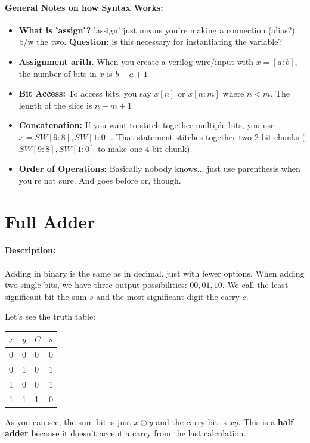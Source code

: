 \documentclass[a4paper,12pt]{report}
\begin{document}
\paragraph{General Notes on how Syntax Works:}
\begin{itemize}
\item \textbf{What is 'assign'? } 'assign' just means you're making a connection (alias?) b/w the
two. \textbf{Question: } is this necessary for instantiating the variable?
\item \textbf{Assignment arith.} When you create a verilog wire/input with $x = [a:b]$, the number of bits in 
$x$ is $b-a + 1$
\item \textbf{Bit Access: } To access bits, you say $x[n]$ or $x[n:m]$ where $n < m$. The length of the slice
is $n-m +1$
\item \textbf{Concatenation: } If you want to stitch together multiple bits, you use $x = {SW[9:8], SW[1:0]}$. That
statement stitches together two 2-bit chunks ($SW[9:8], SW[1:0]$ to make one 4-bit chunk).
\item \textbf{Order of Operations: } Basically nobody knows... just use parenthesis when you're
not sure. And goes before or, though.
\end{itemize}


\section{Full Adder}
\paragraph{Description: }
Adding in binary is the same as in decimal, just with fewer options. When adding two single bits,
we have three output possibilities: $00, 01, 10$. We call the least significant bit the sum $s$ and
the most significant digit the carry $c$.

Let's see the truth table:
\begin{tabular}{ll|ll}
$x$ & $y$ & $C$ & $s$ \\
\hline
0 & 0 & 0 & 0 \\
0 & 1 & 0 & 1 \\
1 & 0 & 0 & 1 \\
1 & 1 & 1 & 0 \\
\end{tabular}

As you can see, the sum bit is just $x \oplus y$ and the carry bit is $xy$. 
This is a \textbf{half adder} because it doesn't accept a carry from the last calculation.
\end{document}
